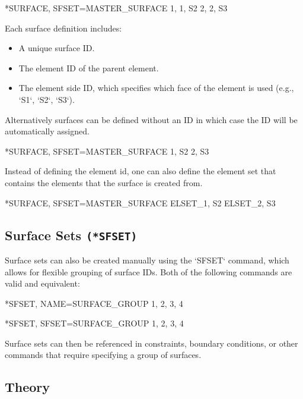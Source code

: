 \begin{codeBlock}
*SURFACE, SFSET=MASTER_SURFACE
1, 1, S2
2, 2, S3
\end{codeBlock}

Each surface definition includes:

\begin{itemize}
    \item A unique surface ID.
    \item The element ID of the parent element.
    \item The element side ID, which specifies which face of the element is used (e.g., `S1`, `S2`, `S3`).
\end{itemize}

Alternatively surfaces can be defined without an ID in which case the ID will be automatically assigned.

\begin{codeBlock}
*SURFACE, SFSET=MASTER_SURFACE
1, S2
2, S3
\end{codeBlock}

Instead of defining the element id, one can also define the element set that contains the elements that the surface is created from.

\begin{codeBlock}
*SURFACE, SFSET=MASTER_SURFACE
ELSET_1, S2
ELSET_2, S3
\end{codeBlock}

\subsection{Surface Sets \texttt{(*SFSET)}}

Surface sets can also be created manually using the `SFSET` command, which allows for flexible grouping of surface IDs.
Both of the following commands are valid and equivalent:

\begin{codeBlock}
*SFSET, NAME=SURFACE_GROUP
1, 2, 3, 4
\end{codeBlock}

\begin{codeBlock}
*SFSET, SFSET=SURFACE_GROUP
1, 2, 3, 4
\end{codeBlock}

Surface sets can then be referenced in constraints, boundary conditions, or other commands that require specifying a group of surfaces.

\subsection{Theory}

